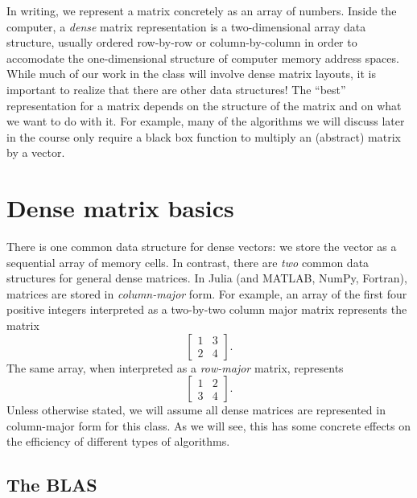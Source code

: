 \documentclass[12pt, leqno]{article}
\begin{document}
In writing, we represent a matrix concretely as an array of numbers.
Inside the computer, a {\em dense} matrix representation is a
two-dimensional array data structure, usually ordered row-by-row or
column-by-column in order to accomodate the one-dimensional structure of
computer memory address spaces.  While much of our work in the class
will involve dense matrix layouts, it is important to realize that there
are other data structures!  The ``best'' representation for a matrix
depends on the structure of the matrix and on what we want to do with
it.  For example, many of the algorithms we will discuss later in the
course only require a black box function to multiply an (abstract)
matrix by a vector.

\section{Dense matrix basics}


There is one common data structure for dense vectors: we store
the vector as a sequential array of memory cells.  In contrast,
there are {\em two} common data structures for general dense matrices.
In Julia (and MATLAB, NumPy, Fortran), matrices are stored
in {\em column-major} form.
For example, an array of the first four positive integers interpreted
as a two-by-two column major matrix represents the matrix
\[
    \begin{bmatrix} 1 & 3 \\ 2 & 4 \end{bmatrix}.
\]
The same array, when interpreted as a {\em row-major} matrix, represents
\[
    \begin{bmatrix} 1 & 2 \\ 3 & 4 \end{bmatrix}.
\]
Unless otherwise stated, we will assume all dense matrices are represented
in column-major form for this class.  As we will see, this has some
concrete effects on the efficiency of different types of algorithms.

\subsection{The BLAS}
\end{document}

